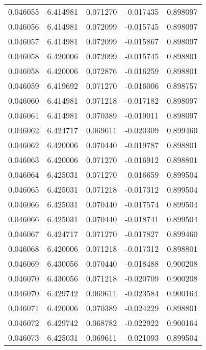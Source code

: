 \begin{tabular}{lrrrr}
0.046055    &  6.414981 &  0.071270 & -0.017435 &             0.898097 \\
0.046056    &  6.414981 &  0.072099 & -0.015745 &             0.898097 \\
0.046057    &  6.414981 &  0.072099 & -0.015867 &             0.898097 \\
0.046058    &  6.420006 &  0.072099 & -0.015745 &             0.898801 \\
0.046058    &  6.420006 &  0.072876 & -0.016259 &             0.898801 \\
0.046059    &  6.419692 &  0.071270 & -0.016006 &             0.898757 \\
0.046060    &  6.414981 &  0.071218 & -0.017182 &             0.898097 \\
0.046061    &  6.414981 &  0.070389 & -0.019011 &             0.898097 \\
0.046062    &  6.424717 &  0.069611 & -0.020309 &             0.899460 \\
0.046062    &  6.420006 &  0.070440 & -0.019787 &             0.898801 \\
0.046063    &  6.420006 &  0.071270 & -0.016912 &             0.898801 \\
0.046064    &  6.425031 &  0.071270 & -0.016659 &             0.899504 \\
0.046065    &  6.425031 &  0.071218 & -0.017312 &             0.899504 \\
0.046066    &  6.425031 &  0.070440 & -0.017574 &             0.899504 \\
0.046066    &  6.425031 &  0.070440 & -0.018741 &             0.899504 \\
0.046067    &  6.424717 &  0.071270 & -0.017827 &             0.899460 \\
0.046068    &  6.420006 &  0.071218 & -0.017312 &             0.898801 \\
0.046069    &  6.430056 &  0.070440 & -0.018488 &             0.900208 \\
0.046070    &  6.430056 &  0.071218 & -0.020709 &             0.900208 \\
0.046070    &  6.429742 &  0.069611 & -0.023584 &             0.900164 \\
0.046071    &  6.420006 &  0.070389 & -0.024229 &             0.898801 \\
0.046072    &  6.429742 &  0.068782 & -0.022922 &             0.900164 \\
0.046073    &  6.425031 &  0.069611 & -0.021093 &             0.899504 \\

\end{tabular}
